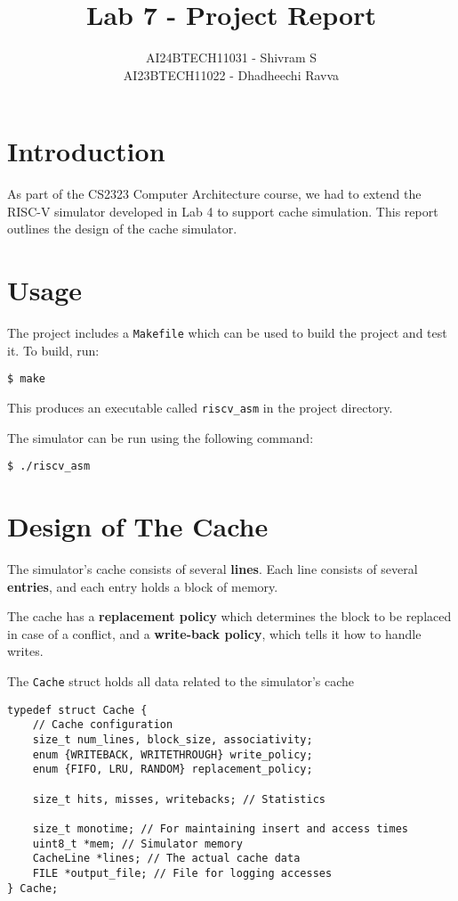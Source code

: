 \documentclass{article}
\title{Lab 7 - Project Report}
\author{AI24BTECH11031 - Shivram S\\
AI23BTECH11022 - Dhadheechi Ravva}
\date{}
\begin{document}
\maketitle
\tableofcontents
\pagebreak

\section{Introduction}

As part of the CS2323 Computer Architecture course, we had to extend the RISC-V 
simulator developed in Lab 4 to support cache simulation. This report outlines
the design of the cache simulator.

\section{Usage}

The project includes a \texttt{Makefile} which can be used to build the project and
test it. To build, run:
\begin{verbatim}
$ make
\end{verbatim} 
This produces an executable called \texttt{riscv\_asm} in the project directory.

The simulator can be run using the following command:
\begin{verbatim}
$ ./riscv_asm
\end{verbatim}

\section{Design of The Cache}


The simulator's cache consists of several \textbf{lines}. Each line consists of several
\textbf{entries}, and each entry holds a block of memory. 

The cache has a \textbf{replacement policy} which determines the block to be replaced in
case of a conflict, and a \textbf{write-back policy}, which tells it how to handle writes.

The \texttt{Cache} struct holds all data related to the simulator's cache

\begin{verbatim} 
typedef struct Cache {
    // Cache configuration
    size_t num_lines, block_size, associativity;
    enum {WRITEBACK, WRITETHROUGH} write_policy;
    enum {FIFO, LRU, RANDOM} replacement_policy;
    
    size_t hits, misses, writebacks; // Statistics

    size_t monotime; // For maintaining insert and access times
    uint8_t *mem; // Simulator memory 
    CacheLine *lines; // The actual cache data
    FILE *output_file; // File for logging accesses
} Cache;
\end{verbatim}
\end{document}
